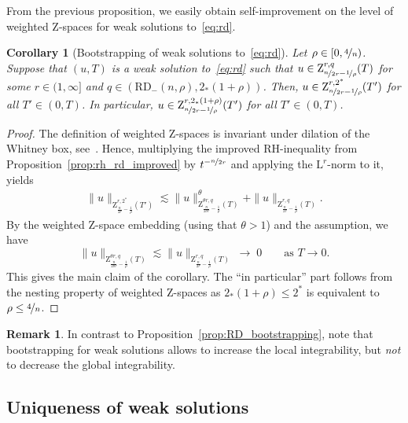 \documentclass[11pt, leqno]{amsart}
\newtheorem{corollary}[theorem]{Corollary}
\theoremstyle{definition}
\newtheorem{remark}[theorem]{Remark}
\renewcommand{\L}{\mathrm{L}}
\newcommand{\Z}{\mathrm{Z}}
\newcommand{\RD}{\mathrm{RD}}
\begin{document}
	From the previous proposition, we easily obtain self-improvement on the level of weighted $\Z$-spaces for weak solutions to~\eqref{eq:rd}.

	\begin{corollary}[Bootstrapping of weak solutions to~\eqref{eq:rd}]
		\label{cor:bootstrapping_weak_rd}
		Let $\rho \in [0, \nicefrac{4}{n})$. Suppose that $(u,
		T)$ is a weak solution to~\eqref{eq:rd} such that $u\in \Z^{r,q}_{\nicefrac{n}{2r} - \nicefrac{1}{\rho}}(T)$ for some $r \in (1, \infty]$ and $q\in (\RD_{-}(n,\rho), 2_*(1+\rho))$. Then, $u \in \Z^{r,2^*}_{\nicefrac{n}{2r} - \nicefrac{1}{\rho}}(T')$ for all $T' \in (0,T)$.
		In particular, $u \in \Z^{r,2_*(1+\rho)}_{\nicefrac{n}{2r} - \nicefrac{1}{\rho}}(T')$ for all $T' \in (0,T)$.
	\end{corollary}

	\begin{proof}
		The definition of weighted $\Z$-spaces is invariant under dilation of the Whitney box, see~\cite[Rem.~3.6]{Luca}. Hence, multiplying the improved RH-inequality from Proposition~\ref{prop:rh_rd_improved} by $t^{-\nicefrac{n}{2r}}$ and applying the $\L^r$-norm to it, yields
		\begin{align}
			\| u \|_{\Z^{r,2^*}_{\frac{n}{2r} - \frac{1}{\rho}}(T')} \lesssim \| u \|_{\Z^{\theta r, q}_{\frac{n}{2\theta r} - \frac{1}{\rho}}(T)}^\theta + \| u \|_{\Z^{r, q}_{\frac{n}{2r} - \frac{1}{\rho}}(T)}.
		\end{align}
		By the weighted $\Z$-space embedding (using that $\theta > 1$) and the assumption, we have
		$$\| u \|_{\Z^{\theta r, q}_{\frac{n}{2\theta r} - \frac{1}{\rho}}(T)} \lesssim \| u \|_{\Z^{r, q}_{\frac{n}{2r} - \frac{1}{\rho}}(T)} \; \to \; 0 \qquad \text{as } T \to 0.$$
		This gives the main claim of the corollary.
		The \enquote{in particular} part follows from the nesting property of weighted $\Z$-spaces as $2_*(1+\rho) \leq 2^*$ is equivalent to $\rho \leq \nicefrac{4}{n}$.
	\end{proof}

	\begin{remark}
		In contrast to Proposition~\ref{prop:RD_bootstrapping}, note that bootstrapping for weak solutions allows to increase the local integrability, but \emph{not} to decrease the global integrability.
	\end{remark}



	\subsection{Uniqueness of weak solutions}
	\label{sec:weak_uniqueness}
\end{document}
